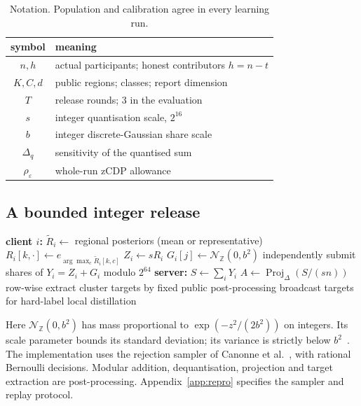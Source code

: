 \begin{table}[t]
\caption{Notation. Population and calibration agree in every learning run.}
\label{tab:notation}\small
\begin{tabular}{@{}cl@{}}\toprule
symbol & meaning \\\midrule
$n,h$ & actual participants; honest contributors $h=n-t$ \\
$K,C,d$ & public regions; classes; report dimension \\
$T$ & release rounds; $3$ in the evaluation \\
$s$ & integer quantisation scale, $2^{16}$ \\
$b$ & integer discrete-Gaussian share scale \\
$\Delta_q$ & sensitivity of the quantised sum \\
$\rho_\varepsilon$ & whole-run zCDP allowance \\
\bottomrule\end{tabular}
\end{table}

\subsection{A bounded integer release}
\label{sec:threat:protocol}

\begin{algorithm}[t]
\caption{One round of Semantic-DP Distillation}
\label{alg:protocol}\small
\begin{algorithmic}[1]
\State \textbf{client $i$:}
\State \quad $\tilde R_i\gets$ regional posteriors (mean or representative)
\State \quad $R_i[k,\cdot]\gets e_{\arg\max_c\tilde R_i[k,c]}$
\State \quad $Z_i\gets sR_i$ 
\State \quad $G_i[j]\gets\mathcal N_{\mathbb Z}(0,b^2)$ independently
\State \quad submit shares of $Y_i=Z_i+G_i$ modulo $2^{64}$
\State \textbf{server:}
\State \quad $S\gets\sum_iY_i$ 
\State \quad $A\gets\operatorname{Proj}_{\Delta}(S/(sn))$ row-wise
\State \quad extract cluster targets by fixed public post-processing
\State \quad broadcast targets for hard-label local distillation
\end{algorithmic}
\end{algorithm}

Here $\mathcal N_{\mathbb Z}(0,b^2)$ has mass proportional to
$\exp(-z^2/(2b^2))$ on integers. Its scale parameter bounds its standard
deviation; its variance is strictly below $b^2$~\cite{kairouz2021distributed}.
The implementation uses the rejection sampler of Canonne et
al.~\cite{canonne2020discrete}, with rational Bernoulli decisions.
Modular addition, dequantisation, projection and target extraction are
post-processing. Appendix~\ref{app:repro} specifies the sampler and replay protocol.

